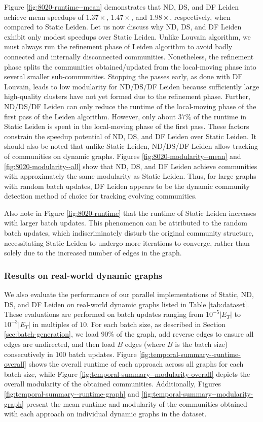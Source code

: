 Figure \ref{fig:8020-runtime--mean} demonstrates that ND, DS, and DF Leiden achieve mean speedups of $1.37\times$, $1.47\times$, and $1.98\times$, respectively, when compared to Static Leiden. Let us now discuss why ND, DS, and DF Leiden exhibit only modest speedups over Static Leiden. Unlike Louvain algorithm, we must always run the refinement phase of Leiden algorithm to avoid badly connected and internally disconnected communities. Nonetheless, the refinement phase splits the communities obtained/updated from the local-moving phase into several smaller sub-communities. Stopping the passes early, as done with DF Louvain, leads to low modularity for ND/DS/DF Leiden because sufficiently large high-quality clusters have not yet formed due to the refinement phase. Further, ND/DS/DF Leiden can only reduce the runtime of the local-moving phase of the first pass of the Leiden algorithm. However, only about $37\%$ of the runtime in Static Leiden is spent in the local-moving phase of the first pass. These factors constrain the speedup potential of ND, DS, and DF Leiden over Static Leiden. It should also be noted that unlike Static Leiden, ND/DS/DF Leiden allow tracking of communities on dynamic graphs. Figures \ref{fig:8020-modularity--mean} and \ref{fig:8020-modularity--all} show that ND, DS, and DF Leiden achieve communities with approximately the same modularity as Static Leiden. Thus, for large graphs with random batch updates, DF Leiden appears to be the dynamic community detection method of choice for tracking evolving communities.

Also note in Figure \ref{fig:8020-runtime} that the runtime of Static Leiden increases with larger batch updates. This phenomenon can be attributed to the random batch updates, which indiscriminately disturb the original community structure, necessitating Static Leiden to undergo more iterations to converge, rather than solely due to the increased number of edges in the graph.


\subsubsection{Results on real-world dynamic graphs}

We also evaluate the performance of our parallel implementations of Static, ND, DS, and DF Leiden on real-world dynamic graphs listed in Table \ref{tab:dataset}. These evaluations are performed on batch updates ranging from $10^{-5}|E_T|$ to $10^{-3}|E_T|$ in multiples of $10$. For each batch size, as described in Section \ref{sec:batch-generation}, we load $90\%$ of the graph, add reverse edges to ensure all edges are undirected, and then load $B$ edges (where $B$ is the batch size) consecutively in $100$ batch updates. Figure \ref{fig:temporal-summary--runtime-overall} shows the overall runtime of each approach across all graphs for each batch size, while Figure \ref{fig:temporal-summary--modularity-overall} depicts the overall modularity of the obtained communities. Additionally, Figures \ref{fig:temporal-summary--runtime-graph} and \ref{fig:temporal-summary--modularity-graph} present the mean runtime and modularity of the communities obtained with each approach on individual dynamic graphs in the dataset.

